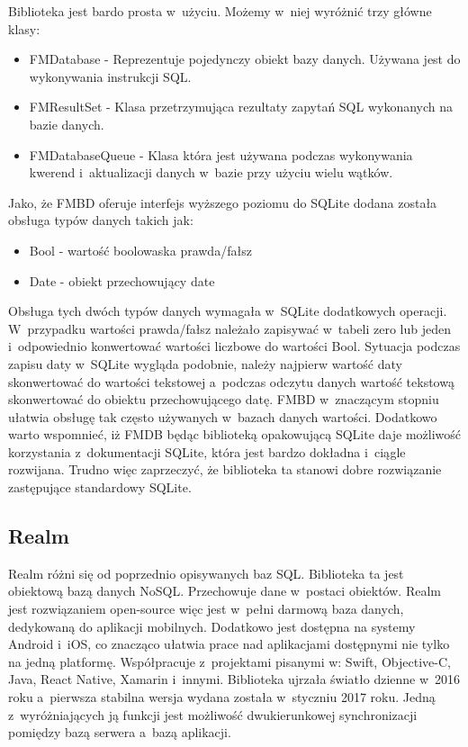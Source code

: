 Biblioteka jest bardo prosta w~użyciu. Możemy w~niej wyróżnić trzy główne klasy: 

\begin{itemize}
	\item  FMDatabase - Reprezentuje pojedynczy obiekt bazy danych. Używana jest do wykonywania instrukcji SQL. 
	\item FMResultSet - Klasa przetrzymująca rezultaty zapytań SQL wykonanych na bazie danych.
	\item FMDatabaseQueue - Klasa która jest używana podczas wykonywania kwerend i~aktualizacji danych w~bazie przy użyciu wielu wątków.
\end{itemize}

Jako, że FMBD oferuje interfejs wyższego poziomu do SQLite dodana została obsługa typów danych takich jak: 

\begin{itemize}
	\item Bool -  wartość boolowaska prawda/fałsz 
	\item Date - obiekt przechowujący date
\end{itemize}

Obsługa tych dwóch typów danych wymagała w~SQLite dodatkowych operacji. W~przypadku wartości prawda/fałsz należało zapisywać w~tabeli zero lub jeden i~odpowiednio konwertować wartości liczbowe do wartości Bool. Sytuacja podczas zapisu daty w~SQLite wygląda podobnie, należy najpierw wartość daty skonwertować do wartości tekstowej a~podczas odczytu danych wartość tekstową skonwertować do obiektu przechowującego datę. FMBD w~znaczącym stopniu ułatwia obsługę tak często używanych w~bazach danych wartości. Dodatkowo warto wspomnieć, iż FMDB będąc biblioteką opakowującą SQLite daje możliwość korzystania z~dokumentacji SQLite, która jest bardzo dokładna i~ciągle rozwijana. Trudno więc zaprzeczyć, że biblioteka ta stanowi dobre rozwiązanie zastępujące standardowy SQLite. 

\subsection{Realm}

Realm różni się od poprzednio opisywanych baz SQL. Biblioteka ta jest obiektową bazą danych NoSQL. Przechowuje dane w~postaci obiektów. Realm jest rozwiązaniem open-source więc jest w~pełni darmową baza danych, dedykowaną do aplikacji mobilnych. Dodatkowo jest dostępna na systemy Android i~iOS, co znacząco ułatwia prace nad aplikacjami dostępnymi nie tylko na jedną platformę. Współpracuje z~projektami pisanymi w: Swift, Objective-C, Java, React Native, Xamarin i~innymi. Biblioteka ujrzała światło dzienne w~2016 roku a~pierwsza stabilna wersja wydana została w~styczniu 2017 roku. Jedną z~wyróżniających ją funkcji jest możliwość dwukierunkowej synchronizacji pomiędzy bazą serwera a~bazą aplikacji.\par 

